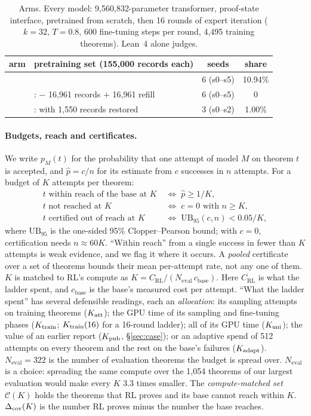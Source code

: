 \begin{table}[t]
\centering\small
\caption{Arms. Every model: 9,560,832-parameter transformer, proof-state interface, pretrained from scratch, then 16
rounds of expert iteration ($k=32$, $T=0.8$, 600 fine-tuning steps per round, 4,495 training theorems). Lean~4 alone
judges.}
\label{tab:arms}
\begin{tabular}{llcc}
\toprule
arm & pretraining set (155,000 records each) & seeds & \sigp{} share \\
\midrule
\Kfull{} & \KT{} & 6 (s0--s5) & 10.94\% \\
\Kko{} & \KTko{}: \KT{} $-$ 16,961 \sigp{} records $+$ 16,961 refill & 6 (s0--s5) & 0 \\
\Kdose{} & \KTdose{}: \KTko{} with 1,550 \sig{} records restored & 3 (s0--s2) & 1.00\% \\
\bottomrule
\end{tabular}
\end{table}

\paragraph{Budgets, reach and certificates.} We write $p_M(t)$ for the probability that one attempt of model $M$ on
theorem $t$ is accepted, and $\hat p = c/n$ for its estimate from $c$ successes in $n$ attempts. For a budget of $K$
attempts per theorem:
\begin{align*}
t \text{ within reach of the base at } K \;&\Longleftrightarrow\; \hat p \geq 1/K, \\
t \text{ not reached at } K \;&\Longleftrightarrow\; c = 0 \text{ with } n \geq K, \\
t \text{ certified out of reach at } K \;&\Longleftrightarrow\; \mathrm{UB}_{95}(c, n) < 0.05/K,
\end{align*}
where $\mathrm{UB}_{95}$ is the one-sided 95\% Clopper--Pearson bound; with $c=0$, certification needs $n \approx 60K$.
``Within reach'' from a single success in fewer than $K$ attempts is weak evidence, and we flag it where it occurs. A
\emph{pooled} certificate over a set of theorems bounds their mean per-attempt rate, not any one of them. $K$ is
matched to RL's compute as $K = C_{\mathrm{RL}} / (N_{\mathrm{eval}}\, c_{\mathrm{base}})$. Here $C_{\mathrm{RL}}$ is
what the ladder spent, and $c_{\mathrm{base}}$ is the base's measured cost per attempt. ``What the ladder spent'' has several defensible
readings, each an \emph{allocation}: its sampling attempts on training theorems ($K_{\mathrm{att}}$); the GPU time of its sampling and
fine-tuning phases ($K_{\mathrm{train}}$; $K_{\mathrm{train}}(16)$ for a 16-round ladder); all of its GPU time ($K_{\mathrm{uni}}$); the value of an
earlier report ($K_{\mathrm{pub}}$, \S\ref{sec:case}); or an adaptive spend of 512 attempts on every theorem and the rest on the
base's failures ($K_{\mathrm{adapt}}$). $N_{\mathrm{eval}} = 322$ is the number of evaluation theorems the budget is spread
over. $N_{\mathrm{eval}}$ is a choice: spreading the same compute over the 1,054 theorems of our largest evaluation
would make every $K$ 3.3 times smaller. The \emph{compute-matched set} $\mathcal{C}(K)$ holds the theorems that RL
proves and its base cannot reach within $K$. $\Delta_{\mathrm{cov}}(K)$ is the number RL proves minus the number the base reaches.


